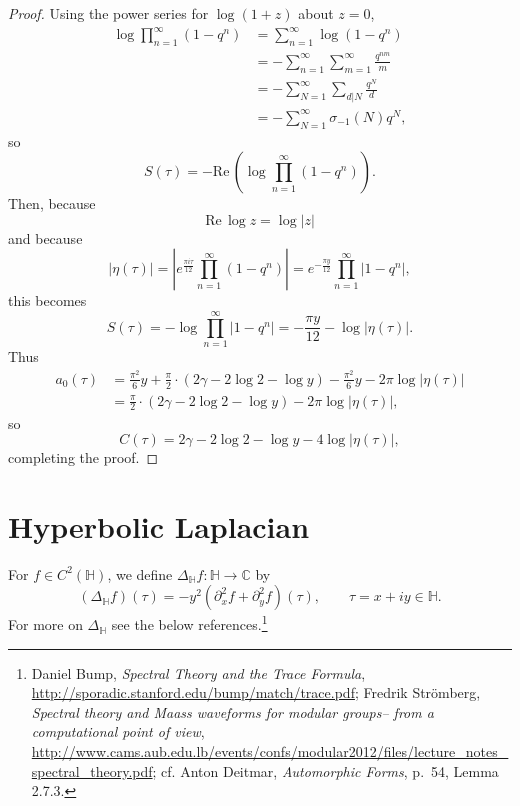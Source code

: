 \documentclass{article}
\def\Re{\ensuremath{\mathrm{Re}}\,}
\theoremstyle{definition}
\begin{document}
\begin{proof}
Using the power series for $\log(1+z)$ about $z=0$,
\begin{align*}
\log \prod_{n=1}^\infty (1-q^n)&=\sum_{n=1}^\infty \log(1-q^n)\\
&=-\sum_{n=1}^\infty \sum_{m=1}^\infty \frac{q^{nm}}{m}\\
&=-\sum_{N=1}^\infty \sum_{d|N} \frac{q^N}{d}\\
&=-\sum_{N=1}^\infty \sigma_{-1}(N) q^N,
\end{align*}
so
\[
S(\tau) = -\Re\left( \log \prod_{n=1}^\infty (1-q^n) \right).
\]
Then, because
\[
\Re \log z = \log |z|
\]
 and because
\[
|\eta(\tau)| = \left| e^{\frac{\pi i \tau}{12}} \prod_{n=1}^\infty (1-q^n) \right|=
e^{-\frac{\pi y}{12}} \prod_{n=1}^\infty |1-q^n|,
\]
this becomes
\[
S(\tau)=-\log \prod_{n=1}^\infty |1-q^n|
=-\frac{\pi y}{12}-\log |\eta(\tau)|.
\]
Thus
\begin{align*}
a_0(\tau) &= \frac{\pi^2}{6}y+\frac{\pi}{2}\cdot (2\gamma-2\log 2-\log y)
-\frac{\pi^2}{6}y-2\pi \log |\eta(\tau)|\\
&=\frac{\pi}{2}\cdot (2\gamma-2\log 2 -\log y)-2\pi \log |\eta(\tau)|,
\end{align*}
so
\[
C(\tau) = 2\gamma-2\log 2-\log y - 4 \log|\eta(\tau)|,
\]
completing the proof.
\end{proof}


\section{Hyperbolic Laplacian}
For $f \in C^2(\mathbb{H})$, we define $\Delta_{\mathbb{H}} f:\mathbb{H} \to \mathbb{C}$ by
\[
(\Delta_{\mathbb{H}} f)(\tau) = -y^2(\partial_x^2 f + \partial_y^2 f)(\tau), 
\qquad \tau = x+iy \in \mathbb{H}.
\]
For more on $\Delta_{\mathbb{H}}$ see the below references.\footnote{Daniel Bump, {\em Spectral Theory and the Trace Formula},
\url{http://sporadic.stanford.edu/bump/match/trace.pdf};
Fredrik Str\"omberg, {\em Spectral theory and Maass waveforms for modular groups--
from a computational point of view},
\url{http://www.cams.aub.edu.lb/events/confs/modular2012/files/lecture_notes_spectral_theory.pdf}; cf. Anton Deitmar, {\em Automorphic Forms},
p.~54, Lemma 2.7.3.}
\end{document}

